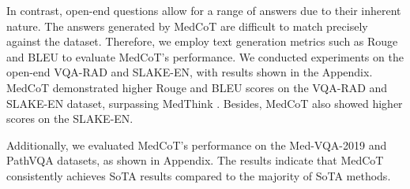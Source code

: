 \documentclass[11pt]{article}
\begin{document}
In contrast, open-end questions allow for a range of answers due to their inherent nature. The answers generated by MedCoT are difficult to match precisely against the dataset. Therefore, we employ text generation metrics such as Rouge and BLEU to evaluate MedCoT's performance.
We conducted experiments on the open-end VQA-RAD and SLAKE-EN, with results shown in the Appendix. 
MedCoT demonstrated higher Rouge and BLEU scores on the VQA-RAD and SLAKE-EN dataset, surpassing MedThink \cite{gai2024medthink}.
Besides, MedCoT also showed higher scores on the SLAKE-EN.

Additionally, we evaluated MedCoT's performance on the Med-VQA-2019 and PathVQA datasets, as shown in Appendix. The results indicate that MedCoT consistently achieves SoTA results compared to the majority of SoTA methods.




\end{document}
